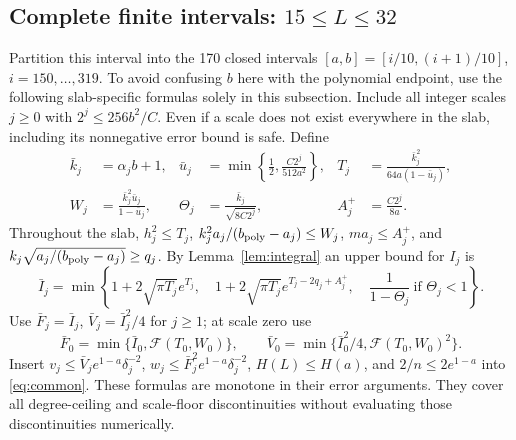 \documentclass[10pt]{article}
\begin{document}
\subsection{Complete finite intervals: $15\le L\le32$}
Partition this interval into the 170 closed intervals
$[a,b]=[i/10,(i+1)/10]$, $i=150,\ldots,319$.
To avoid confusing $b$ here with the polynomial endpoint, use the following
slab-specific formulas solely in this subsection. Include all integer scales
$j\ge0$ with $2^j\le256b^2/C$. Even if a scale does not exist everywhere in
the slab, including its nonnegative error bound is safe. Define
\begin{align*}
 \bar k_j&=\alpha_j b+1,&
 \bar u_j&=\min\left\{\tfrac12,\frac{C2^j}{512a^2}\right\},&
 T_j&=\frac{\bar k_j^2}{64a(1-\bar u_j)},\\
 W_j&=\frac{\bar k_j^2\bar u_j}{1-\bar u_j},&
 \Theta_j&=\frac{\bar k_j}{\sqrt{8C2^j}},&
 A_j^+&=\frac{C2^j}{8a}.
\end{align*}
Throughout the slab, $h_j^2\le T_j$, $k_j^2a_j/(b_{\rm poly}-a_j)\le W_j$,
$ma_j\le A_j^+$, and $k_j\sqrt{a_j/(b_{\rm poly}-a_j)}\ge q_j$.
By Lemma~\ref{lem:integral} an upper bound for $I_j$ is
\[
 \bar I_j=\min\left\{
 1+2\sqrt{\pi T_j}e^{T_j},\quad
 1+2\sqrt{\pi T_j}e^{T_j-2q_j+A_j^+},\quad
 \frac1{1-\Theta_j}\ \text{if }\Theta_j<1\right\}.
\]
Use $\bar F_j=\bar I_j$, $\bar V_j=\bar I_j^2/4$ for $j\ge1$;
at scale zero use
\[
 \bar F_0=\min\{\bar I_0,\mathcal F(T_0,W_0)\},\qquad
 \bar V_0=\min\{\bar I_0^2/4,\mathcal F(T_0,W_0)^2\}.
\]
Insert $v_j\le\bar V_j e^{1-a}\delta_j^{-2}$,
$w_j\le\bar F_j^2 e^{1-a}\delta_j^{-2}$, $H(L)\le H(a)$, and
$2/n\le2e^{1-a}$ into \eqref{eq:common}.
These formulas are monotone in their error arguments. They cover all
degree-ceiling and scale-floor discontinuities without evaluating those
discontinuities numerically.
\end{document}
